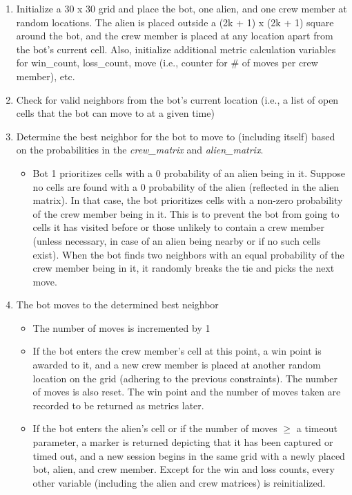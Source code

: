 \documentclass[11pt]{article}
\begin{document}
\begin{enumerate}
    \item Initialize a 30 x 30 grid and place the bot, one alien, and one crew member at random locations. The alien is placed outside a (2k + 1) x (2k + 1) square around the bot, and the crew member is placed at any location apart from the bot's current cell. Also, initialize additional metric calculation variables for win\_count, loss\_count, move (i.e., counter for \# of moves per crew member), etc.
    \item Check for valid neighbors from the bot's current location (i.e., a list of open cells that the bot can move to at a given time)
    \item Determine the best neighbor for the bot to move to (including itself) based on the probabilities in the \textit{crew\_matrix} and \textit{alien\_matrix}.
    \begin{itemize}
        \item Bot 1 prioritizes cells with a 0 probability of an alien being in it. Suppose no cells are found with a 0 probability of the alien (reflected in the alien matrix). In that case, the bot prioritizes cells with a non-zero probability of the crew member being in it. This is to prevent the bot from going to cells it has visited before or those unlikely to contain a crew member (unless necessary, in case of an alien being nearby or if no such cells exist). When the bot finds two neighbors with an equal probability of the crew member being in it, it randomly breaks the tie and picks the next move.
    \end{itemize}
    \item The bot moves to the determined best neighbor
    \begin{itemize}
        \item The number of moves is incremented by 1
        \item If the bot enters the crew member's cell at this point, a win point is awarded to it, and a new crew member is placed at another random location on the grid (adhering to the previous constraints). The number of moves is also reset. The win point and the number of moves taken are recorded to be returned as metrics later.
        \item If the bot enters the alien's cell or if the number of moves $\geq$ a timeout parameter, a marker is returned depicting that it has been captured or timed out, and a new session begins in the same grid with a newly placed bot, alien, and crew member. Except for the win and loss counts, every other variable (including the alien and crew matrices) is reinitialized.

\end{itemize}
\end{enumerate}
\end{document}
